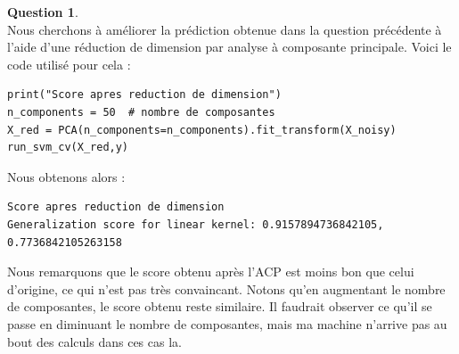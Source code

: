 \documentclass[11pt,a4paper]{article}
\theoremstyle{definition}
\newtheorem{Qu}{Question}
\begin{document}
\begin{Qu}~\\

Nous cherchons à améliorer la prédiction obtenue dans la question précédente à l'aide d'une réduction de dimension par analyse à composante principale. Voici le code utilisé pour cela : 

\begin{verbatim}
print("Score apres reduction de dimension")
n_components = 50  # nombre de composantes
X_red = PCA(n_components=n_components).fit_transform(X_noisy)
run_svm_cv(X_red,y)
\end{verbatim}

Nous obtenons alors : 

\begin{verbatim}
Score apres reduction de dimension
Generalization score for linear kernel: 0.9157894736842105, 0.7736842105263158
\end{verbatim}

Nous remarquons que le score obtenu après l'ACP est moins bon que celui d'origine, ce qui n'est pas très convaincant. Notons qu'en augmentant le nombre de composantes, le score obtenu reste similaire. Il faudrait observer ce qu'il se passe en diminuant le nombre de composantes, mais ma machine n'arrive pas au bout des calculs dans ces cas la. 


 
\end{Qu}
\end{document}
